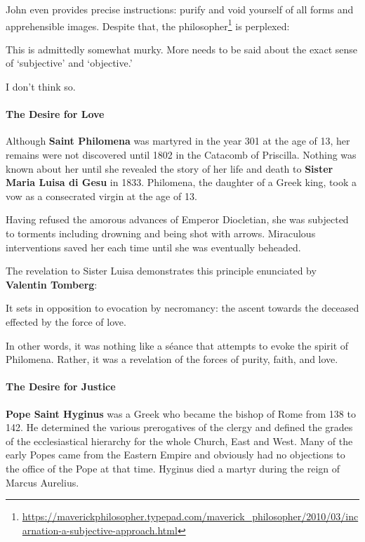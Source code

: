John even provides precise instructions: purify and void yourself of all forms and apprehensible images. Despite that, the philosopher\footnote{\url{https://maverickphilosopher.typepad.com/maverick\_philosopher/2010/03/incarnation-a-subjective-approach.html}} is perplexed:

\begin{quotex}
This is admittedly somewhat murky. More needs to be said about the exact sense of `subjective' and `objective.'
\end{quotex}


I don't think so.

\paragraph{The Desire for Love}


Although \textbf{Saint Philomena} was martyred in the year 301 at the age of 13, her remains were not discovered until 1802 in the Catacomb of Priscilla. Nothing was known about her until she revealed the story of her life and death to \textbf{Sister Maria Luisa di Gesu} in 1833. Philomena, the daughter of a Greek king, took a vow as a consecrated virgin at the age of 13.

Having refused the amorous advances of Emperor Diocletian, she was subjected to torments including drowning and being shot with arrows. Miraculous interventions saved her each time until she was eventually beheaded.

The revelation to Sister Luisa demonstrates this principle enunciated by \textbf{Valentin Tomberg}:

\begin{quotex}
It sets in opposition to evocation by necromancy: the ascent towards the deceased effected by the force of love.
\end{quotex}


In other words, it was nothing like a séance that attempts to evoke the spirit of Philomena. Rather, it was a revelation of the forces of purity, faith, and love.

\paragraph{The Desire for Justice}


\textbf{Pope Saint Hyginus} was a Greek who became the bishop of Rome from 138 to 142. He determined the various prerogatives of the clergy and defined the grades of the ecclesiastical hierarchy for the whole Church, East and West. Many of the early Popes came from the Eastern Empire and obviously had no objections to the office of the Pope at that time. Hyginus died a martyr during the reign of Marcus Aurelius.

